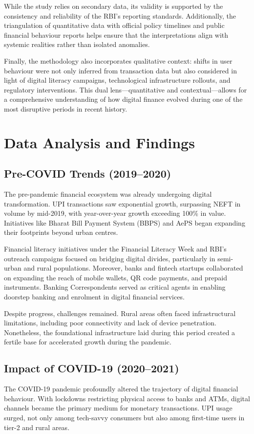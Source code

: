 \documentclass[conference]{IEEEtran}
\begin{document}
While the study relies on secondary data, its validity is supported by the consistency and reliability of the RBI’s reporting standards. Additionally, the triangulation of quantitative data with official policy timelines and public financial behaviour reports helps ensure that the interpretations align with systemic realities rather than isolated anomalies.

Finally, the methodology also incorporates qualitative context: shifts in user behaviour were not only inferred from transaction data but also considered in light of digital literacy campaigns, technological infrastructure rollouts, and regulatory interventions. This dual lens—quantitative and contextual—allows for a comprehensive understanding of how digital finance evolved during one of the most disruptive periods in recent history.

\section{Data Analysis and Findings}

\subsection{Pre-COVID Trends (2019--2020)}
The pre-pandemic financial ecosystem was already undergoing digital transformation. UPI transactions saw exponential growth, surpassing NEFT in volume by mid-2019, with year-over-year growth exceeding 100\% in value. Initiatives like Bharat Bill Payment System (BBPS) and AePS began expanding their footprints beyond urban centres.

Financial literacy initiatives under the Financial Literacy Week and RBI’s outreach campaigns focused on bridging digital divides, particularly in semi-urban and rural populations. Moreover, banks and fintech startups collaborated on expanding the reach of mobile wallets, QR code payments, and prepaid instruments. Banking Correspondents served as critical agents in enabling doorstep banking and enrolment in digital financial services.

Despite progress, challenges remained. Rural areas often faced infrastructural limitations, including poor connectivity and lack of device penetration. Nonetheless, the foundational infrastructure laid during this period created a fertile base for accelerated growth during the pandemic.
    
\subsection{Impact of COVID-19 (2020--2021)}
The COVID-19 pandemic profoundly altered the trajectory of digital financial behaviour. With lockdowns restricting physical access to banks and ATMs, digital channels became the primary medium for monetary transactions. UPI usage surged, not only among tech-savvy consumers but also among first-time users in tier-2 and rural areas.
\end{document}
